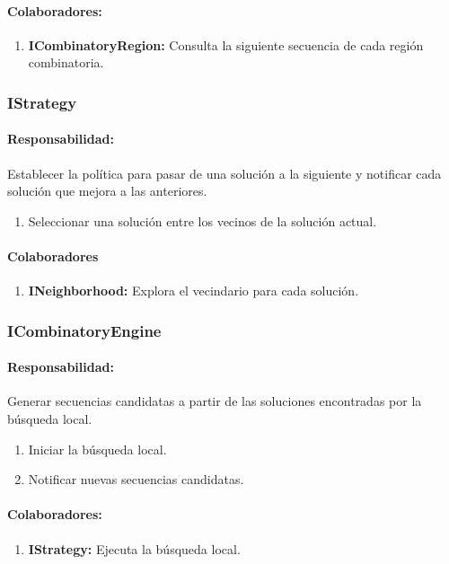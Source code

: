     \paragraph{Colaboradores:}
      \begin{enumerate}
       \item \textbf{ICombinatoryRegion:} Consulta la siguiente secuencia de
cada regi\'on combinatoria.
      \end{enumerate}

  \subsubsection{IStrategy}
    \paragraph{Responsabilidad:} Establecer la pol\'itica para pasar de una
soluci\'on a la siguiente y notificar cada soluci\'on que mejora a las
anteriores.
      \begin{enumerate}       
       \item Seleccionar una soluci\'on entre los vecinos de la soluci\'on
actual.
      \end{enumerate}
   \paragraph{Colaboradores}
    \begin{enumerate}
     \item \textbf{INeighborhood:} Explora el vecindario para cada soluci\'on. 
    \end{enumerate}

  \subsubsection{ICombinatoryEngine}
    \paragraph{Responsabilidad:} Generar secuencias candidatas a partir de las
soluciones encontradas por la b\'usqueda local.
      \begin{enumerate}       
       \item Iniciar la b\'usqueda local.
       \item Notificar nuevas secuencias candidatas.
      \end{enumerate}
    \paragraph{Colaboradores:}
      \begin{enumerate}       
       \item \textbf{IStrategy:} Ejecuta la b\'usqueda local.
      \end{enumerate} 

